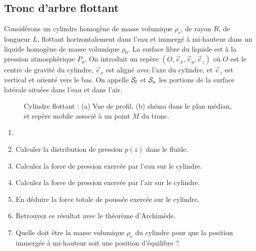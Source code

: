 {{%
\subsection{Tronc d'arbre flottant}

Consid\'erons un cylindre homogène de masse volumique $\rho_c$, de rayon $R$,
de longueur $L$, flottant horizontalement dans l'eau et immergé à mi-hauteur 
dans un liquide homogène de masse volumique $\rho_0$.
La surface libre du liquide est \`a la pression atmosph\'erique $P_a$.
On introduit un repère $(O, \vec e_x, \vec e_y,\vec e_z)$ où $O$ est le centre
de gravité du cylindre, $\vec e_x$ est aligné avec l'axe du cylindre,
et $\vec e_z$ est vertical et orienté vers le bas.
On appelle ${\cal S}_l$ et ${\cal S}_a$ les portions de la surface latérale 
situées dans l'eau et dans l'air.


\begin{figure}[htb]
\begin{center}
 \qquad 
\end{center}
\caption{Cylindre flottant : (a) Vue de profil, (b) shéma dans le plan médian,
et repère mobile associé à un point $M$ du tronc.}
\label{fig:statique}
\end{figure}

\begin{enumerate}
\item

\item
Calculer la distribution de pression $p(z)$ dans le fluide.
\item
Calculez la force de pression exercée par l'eau sur le cylindre.
\item 
Calculez la force de pression exercée par l'air sur le cylindre.
\item 
En déduire la force totale de poussée exercée sur le cylindre.
\item 
Retrouvez ce résultat avec le théorème d'Archimède.
\item Quelle doit être la masse volumique $\rho_c$ du cylindre pour
que la position immergée à mi-hauteur soit une position d'équilibre ?

\end{enumerate}



}}

